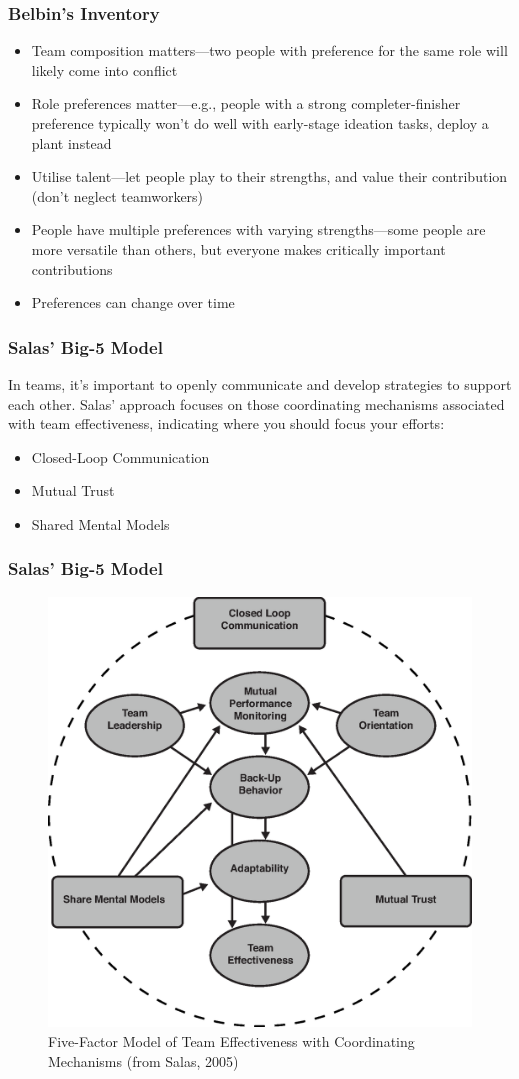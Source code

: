 \begin{frame}
	\frametitle{Belbin's Inventory}
		
	\begin{itemize}
		\item Team composition matters---two people with preference for the same role will likely come into conflict
		\item Role preferences matter---e.g., people with a strong completer-finisher preference typically won't do well with early-stage ideation tasks, deploy a plant instead
		\item Utilise talent---let people play to their strengths, and value their contribution (don't neglect teamworkers)
		\item People have multiple preferences with varying strengths---some people are more versatile than others, but everyone makes critically important contributions
		\item Preferences can change over time
	\end{itemize}
	
\end{frame}

\begin{frame}
	\frametitle{Salas' Big-5 Model}
	
	In teams, it's important to openly communicate and develop strategies to support each other. Salas' approach focuses on those coordinating mechanisms associated with team effectiveness, indicating where you should focus your efforts:
	
	\begin{itemize}
		\item Closed-Loop Communication
		\item Mutual Trust
		\item Shared Mental Models
	\end{itemize}
	
\end{frame}

\begin{frame}
	\frametitle{Salas' Big-5 Model}
	\vspace{0.5em}
	
\begin{figure}[!tb]
\centering
\includegraphics[width=.55\textwidth]{five_team.eps}
\caption{Five-Factor Model of Team Effectiveness with Coordinating Mechanisms (from Salas, 2005)}
\label{fig:five-teamwork}
\end{figure}
	
\end{frame}

